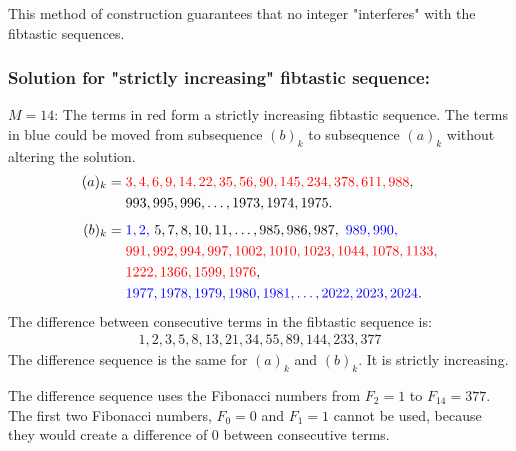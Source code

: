 This method of construction guarantees that no integer "interferes" with the fibtastic sequences. 

\subsubsection*{Solution for "strictly increasing" fibtastic sequence:}
$M=14$: The terms in red form a strictly increasing fibtastic sequence. The terms in blue could be moved from subsequence $(b)_{k}$ to subsequence $(a)_{k}$ without altering the solution. 
\begin{align*}
(a)_{k} 
& = \textcolor{red}{3, 4, 6, 9, 14, 22, 35, 56, 90, 145, 234, 378, 611, 988},
\\ 
& \quad\
993, 995, 996, \ldots, 1973, 1974, 1975.
\\[1ex] 
(b)_{k} 
& = \textcolor{blue}{1, 2,} \
5, 7, 8, 10, 11, \ldots, 985, 986, 987, \
\textcolor{blue}{989, 990,} 
\\
& \quad\
\textcolor{red}{991, 992, 994, 997, 1002, 1010, 1023, 1044, 1078, 1133,}
\\
& \quad\
\textcolor{red}{1222, 1366, 1599, 1976}, 
\\
& \quad\
\textcolor{blue}{1977, 1978, 1979, 1980, 1981, \ldots, 2022, 2023, 2024}.
\end{align*}
The difference between consecutive terms in the fibtastic sequence is:
\begin{align*}
1, 2, 3, 5, 8, 13, 21, 34, 55, 89, 144, 233, 377
\end{align*}
The difference sequence is the same for $(a)_{k}$ and $(b)_{k}$. It is strictly increasing. 

The difference sequence uses the Fibonacci numbers from $F_{2}=1$ to $F_{14}=377$. The first two Fibonacci numbers, $F_{0}=0$ and $F_{1}=1$ cannot be used, because they would create a difference of $0$ between consecutive terms.


